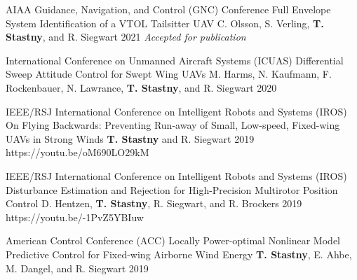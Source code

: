 \begin{cventries}

\begin{flushleft}
\end{flushleft}

\begin{cvnumlist}
%
\item \cvpubentry
	{AIAA Guidance, Navigation, and Control (GNC) Conference} %
	{Full Envelope System Identification of a VTOL Tailsitter UAV} %
	{C. Olsson, S. Verling, \textbf{T. Stastny}, and R. Siegwart} %
	{} %
	{2021} %
	{} %
	{\textit{Accepted for publication}} %

\item \cvpubentry
	{International Conference on Unmanned Aircraft Systems (ICUAS)} %
	{Differential Sweep Attitude Control for Swept Wing UAVs} %
	{M. Harms, N. Kaufmann, F. Rockenbauer, N. Lawrance, \textbf{T. Stastny}, and R. Siegwart} %
	{} %
	{2020} %
	{} %
	{} %
	
\item \cvpubentry
	{IEEE/RSJ International Conference on Intelligent Robots and Systems (IROS)} %
	{On Flying Backwards: Preventing Run-away of Small, Low-speed, Fixed-wing UAVs in Strong Winds} %
	{\textbf{T. Stastny} and R. Siegwart} %
	{} %
	{2019} %
	{https://youtu.be/oM690LO29kM} %
	{} %

\item \cvpubentry
	{IEEE/RSJ International Conference on Intelligent Robots and Systems (IROS)} %
	{Disturbance Estimation and Rejection for High-Precision Multirotor Position Control} %
	{D. Hentzen, \textbf{T. Stastny}, R. Siegwart, and R. Brockers} %
	{} %
	{2019} %
	{https://youtu.be/-1PvZ5YBIuw} %
	{} %

\item \cvpubentry
	{American Control Conference (ACC)} %
	{Locally Power-optimal Nonlinear Model Predictive Control for Fixed-wing Airborne Wind Energy} %
	{\textbf{T. Stastny}, E. Ahbe, M. Dangel, and R. Siegwart} %
	{} %
	{2019} %
	{} %
	{} %


\end{cvnumlist}
\end{cventries}
